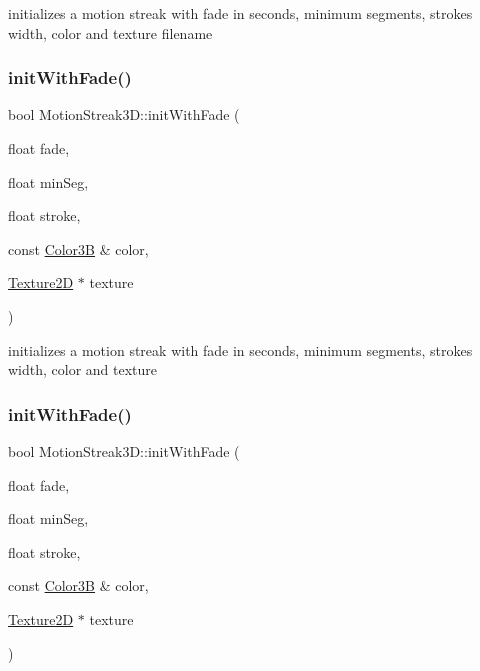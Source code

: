initializes a motion streak with fade in seconds, minimum segments, stroke\textquotesingle{}s width, color and texture filename \mbox{\label{classMotionStreak3D_a6b99e3a23ebf47e35f83a9cab843ee9d}} 
\subsubsection{\texorpdfstring{init\+With\+Fade()}{initWithFade()}\hspace{0.1cm}{\footnotesize\ttfamily [3/4]}}
{\footnotesize\ttfamily bool Motion\+Streak3\+D\+::init\+With\+Fade (\begin{DoxyParamCaption}\item[{float}]{fade,  }\item[{float}]{min\+Seg,  }\item[{float}]{stroke,  }\item[{const \hyperlink{structColor3B}{Color3B} \&}]{color,  }\item[{\hyperlink{classTexture2D}{Texture2D} $\ast$}]{texture }\end{DoxyParamCaption})}

initializes a motion streak with fade in seconds, minimum segments, stroke\textquotesingle{}s width, color and texture \mbox{\label{classMotionStreak3D_a6b99e3a23ebf47e35f83a9cab843ee9d}} 
\subsubsection{\texorpdfstring{init\+With\+Fade()}{initWithFade()}\hspace{0.1cm}{\footnotesize\ttfamily [4/4]}}
{\footnotesize\ttfamily bool Motion\+Streak3\+D\+::init\+With\+Fade (\begin{DoxyParamCaption}\item[{float}]{fade,  }\item[{float}]{min\+Seg,  }\item[{float}]{stroke,  }\item[{const \hyperlink{structColor3B}{Color3B} \&}]{color,  }\item[{\hyperlink{classTexture2D}{Texture2D} $\ast$}]{texture }\end{DoxyParamCaption})}

